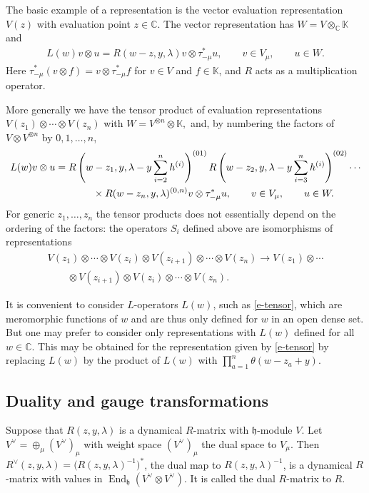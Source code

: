 \documentclass[pdftex]{sigma}
\numberwithin{equation}{section}
\begin{document}
The basic example of a representation is the vector evaluation representation $V(z)$ with evaluation point $z\in\mathbb C$. The vector representation has $W=V\otimes_{\mathbb C} \mathbb K$ and
\begin{gather*}
 L(w)v\otimes u=R(w-z,y,\lambda)v\otimes\tau_{-\mu}^* u,\qquad v\in V_\mu,\qquad u\in W.
\end{gather*}
Here $\tau^*_{-\mu} (v\otimes f)=v\otimes \tau_{-\mu}^*f$ for $v\in V$ and
$f\in\mathbb K$, and $R$ acts as a multiplication operator.

More generally we have the tensor product of evaluation
representations $V(z_1)\otimes\cdots\otimes V(z_n)$ with
$ W=V^{\otimes n}\otimes \mathbb K, $ and, by numbering the factors of
$V\otimes V^{\otimes n}$ by $0,1,\dots,n$,
\begin{gather}
 L(w)v\otimes u =R\left(w-z_1,y,\lambda-y\sum_{i=2}^nh^{(i)}\right)^{(01)} R\left(w-z_2,y,\lambda-y \sum_{i=3}^nh^{(i)}\right)^{(02)}\cdots\nonumber\\
\hphantom{L(w)v\otimes u =}{}\times R(w-z_n,y,\lambda)^{(0,n)} v\otimes\tau_{-\mu}^* u, \qquad v\in V_\mu,\qquad u\in W.\label{e-tensor}
\end{gather}
For generic $z_1,\dots, z_n$ the tensor products does not essentially depend on the ordering of the factors: the operators $S_i$ defined above are isomorphisms of representations
\begin{gather*}
 V(z_1)\otimes \cdots \otimes V(z_i)\otimes V(z_{i+1})\otimes\cdots\otimes V(z_n) \to V(z_1)\otimes \cdots \\
 \qquad{}\otimes V(z_{i+1})\otimes V(z_i)\otimes\cdots\otimes V(z_n).
\end{gather*}
\begin{Remark} It is convenient to consider $L$-operators $L(w)$, such as \eqref{e-tensor}, which are meromorphic functions of $w$ and are thus only defined for $w$ in an open dense set. But one may prefer to consider
only representations with $L(w)$ defined for all $w\in\mathbb C$. This may be obtained for the representation given by \eqref{e-tensor} by replacing $L(w)$ by the product of $L(w)$ with $\prod\limits_{a=1}^n\theta(w-z_a+y)$.
\end{Remark}
\subsection{Duality and gauge transformations}\label{ss-2.2}
Suppose that $R(z,y,\lambda)$ is a dynamical $R$-matrix with $\mathfrak h$-module $V$. Let $V^\vee=\oplus_\mu (V^\vee)_\mu$ with weight space $(V^\vee)_\mu$ the dual space to $V_\mu$. Then $R^\vee(z,y,\lambda)=\big(R(z,y,\lambda)^{-1}\big)^*$, the dual map to $R(z,y,\lambda)^{-1}$, is a dynamical $R$-matrix with values in $\operatorname{End}_{\mathfrak h}(V^\vee\otimes V^\vee)$. It is called the dual $R$-matrix to $R$.
\end{document}
